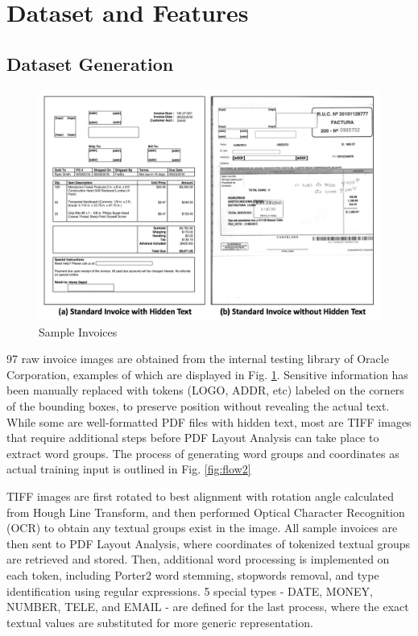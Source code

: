 \section{Dataset and Features}
\subsection{Dataset Generation}
\label{sec:dandf}
\begin{figure}[H]
\centering
\includegraphics[width=1\linewidth]{invoiceexp.png}
\caption{Sample Invoices}
\label{fig:invoiceexp}
\end{figure}

97 raw invoice images are obtained from the internal testing library of Oracle Corporation, examples of which are displayed in Fig. \ref{fig:invoiceexp}. Sensitive information has been manually replaced with tokens (LOGO, ADDR, etc) labeled on the corners of the bounding boxes, to preserve position without revealing the actual text. While some are well-formatted PDF files with hidden text, most are TIFF images that require additional steps before PDF Layout Analysis\cite{shinyamapdfminer} can take place to extract word groups. The process of generating word groups and coordinates as actual training input is outlined  in Fig. \ref{fig:flow2}

TIFF images are first rotated to best alignment with rotation angle calculated from Hough Line Transform\cite{vc1962method}, and then performed Optical Character Recognition (OCR)\cite{smith2007overview} to obtain any textual groups exist in the image. All sample invoices are then sent to PDF Layout Analysis, where coordinates of tokenized textual groups are retrieved and stored. Then, additional word processing is implemented on each token, including Porter2 word stemming\cite{stemming}, stopwords removal\cite{loper205028nltk}, and type identification using regular expressions. 5 special types - DATE, MONEY, NUMBER, TELE, and EMAIL - are defined for the last process, where the exact textual values are substituted for more generic representation.

